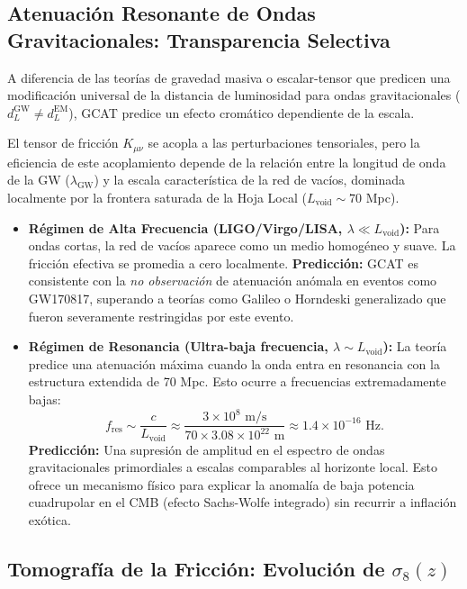 \documentclass[12pt, a4paper]{article}
\theoremstyle{plain}
\theoremstyle{definition}
\begin{document}
\subsection{Atenuación Resonante de Ondas Gravitacionales: Transparencia Selectiva}

A diferencia de las teorías de gravedad masiva o escalar-tensor que predicen una modificación universal de la distancia de luminosidad para ondas gravitacionales ($d_L^{\text{GW}} \neq d_L^{\text{EM}}$), GCAT predice un efecto cromático dependiente de la escala.

El tensor de fricción $K_{\mu\nu}$ se acopla a las perturbaciones tensoriales, pero la eficiencia de este acoplamiento depende de la relación entre la longitud de onda de la GW ($\lambda_{\text{GW}}$) y la escala característica de la red de vacíos, dominada localmente por la frontera saturada de la Hoja Local ($L_{\text{void}} \sim 70$ Mpc).

\begin{itemize}
    \item \textbf{Régimen de Alta Frecuencia (LIGO/Virgo/LISA, $\lambda \ll L_{\text{void}}$):} Para ondas cortas, la red de vacíos aparece como un medio homogéneo y suave. La fricción efectiva se promedia a cero localmente. \textbf{Predicción:} GCAT es consistente con la \textit{no observación} de atenuación anómala en eventos como GW170817, superando a teorías como Galileo o Horndeski generalizado que fueron severamente restringidas por este evento.
    
    \item \textbf{Régimen de Resonancia (Ultra-baja frecuencia, $\lambda \sim L_{\text{void}}$):} La teoría predice una atenuación máxima cuando la onda entra en resonancia con la estructura extendida de 70 Mpc. Esto ocurre a frecuencias extremadamente bajas:
    \begin{equation}
    f_{\text{res}} \sim \frac{c}{L_{\text{void}}} \approx \frac{3\times 10^8 \text{ m/s}}{70 \times 3.08 \times 10^{22} \text{ m}} \approx 1.4 \times 10^{-16} \text{ Hz}.
    \end{equation}
    \textbf{Predicción:} Una supresión de amplitud en el espectro de ondas gravitacionales primordiales a escalas comparables al horizonte local. Esto ofrece un mecanismo físico para explicar la anomalía de baja potencia cuadrupolar en el CMB (efecto Sachs-Wolfe integrado) sin recurrir a inflación exótica.
\end{itemize}

\subsection{Tomografía de la Fricción: Evolución de $\sigma_8(z)$}
\end{document}
